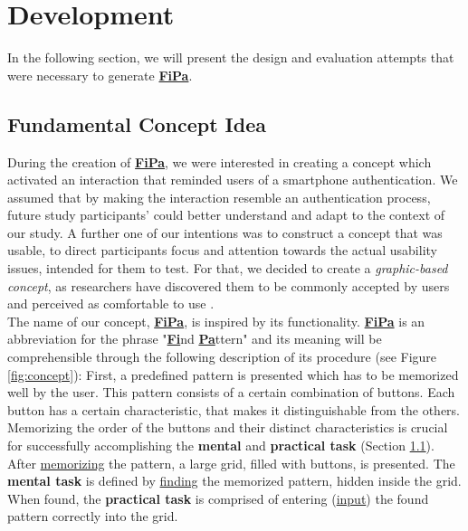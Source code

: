 \section{Development} \label{4.2}

In the following section, we will present the design and evaluation attempts that were necessary to generate \underline{\textbf{FiPa}}.

\subsection{Fundamental Concept Idea} \label{4.2.1}

During the creation of \underline{\textbf{FiPa}}, we were interested in creating a concept which activated an interaction that reminded users of a smartphone authentication. We assumed that by making the interaction resemble an authentication process, future study participants' could better understand and adapt to the context of our study. A further one of our intentions was to construct a concept that was usable, to direct participants focus and attention towards the actual usability issues, intended for them to test. For that, we decided to create a \textit{graphic-based concept}, as researchers have discovered them to be commonly accepted by users and perceived as comfortable to use \cite{PatternWild}. \\ 

The name of our concept, \underline{\textbf{FiPa}}, is inspired by its functionality. \underline{\textbf{FiPa}} is an abbreviation for the phrase "\underline{\textbf{Fi}}nd \underline{\textbf{Pa}}ttern" and its meaning will be comprehensible through the following description of its procedure (see Figure \ref{fig:concept}): First, a predefined pattern is presented which has to be memorized well by the user. This pattern consists of a certain combination of buttons. Each button has a certain characteristic, that makes it distinguishable from the others. Memorizing the order of the buttons and their distinct characteristics is crucial for successfully accomplishing the \textbf{mental} and \textbf{practical task} (Section \ref{4.2.1}). After \underline{memorizing} the pattern, a large grid, filled with buttons, is presented. The \textbf{mental task} is defined by \underline{finding} the memorized pattern, hidden inside the grid. When found, the \textbf{practical task} is comprised of entering  (\underline{input}) the found pattern correctly into the grid.\\


